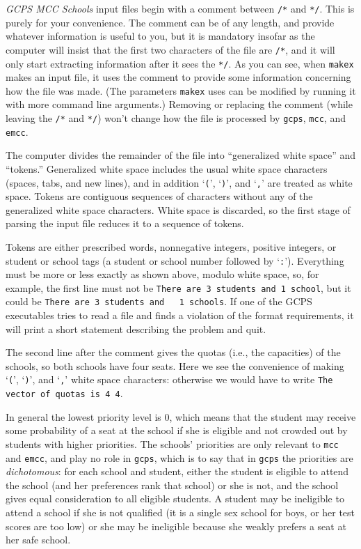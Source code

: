 \documentclass[12pt]{article}
\theoremstyle{definition}
\begin{document}
\medskip

\emph{GCPS MCC Schools} input files begin with a comment between
\texttt{/*} and \texttt{*/}.  This is purely for your convenience.
The comment can be of any length, and provide whatever information is
useful to you, but it is mandatory insofar as the computer will insist
that the first two characters of the file are \texttt{/*}, and it will
only start extracting information after it sees the \texttt{*/}.  As
you can see, when \texttt{makex} makes an input file, it uses the
comment to provide some information concerning how the file was made.
(The parameters \texttt{makex} uses can be modified by running it with
more command line arguments.)  Removing or replacing the comment
(while leaving the \texttt{/*} and \texttt{*/}) won't change how the
file is processed by \texttt{gcps}, \texttt{mcc}, and \texttt{emcc}.

The computer divides the remainder of the file into ``generalized
white space'' and ``tokens.''  Generalized white space includes the
usual white space characters (spaces, tabs, and new lines), and in
addition `\texttt{(}', `\texttt{)}', and `\texttt{,}' are treated as
white space.  Tokens are contiguous sequences of characters without
any of the generalized white space characters.  White space is
discarded, so the first stage of parsing the input file reduces it to
a sequence of tokens.

Tokens are either prescribed words, nonnegative integers, positive
integers, or student or school tags (a student or school number
followed by `\texttt{:}').  Everything must be more or less exactly as
shown above, modulo white space, so, for example, the first line must
not be \texttt{There are 3 students and 1 school}, but it could be
\texttt{There are 3 students and \ \ 1 schools}.  If one of the GCPS
executables tries to read a file and finds a violation of the format
requirements, it will print a short statement describing the problem
and quit.

The second line after the comment gives the quotas (i.e., the
capacities) of the schools, so both schools have four seats.
Here we see the convenience of making `\texttt{(}', `\texttt{)}', and
`\texttt{,}' white space characters: otherwise we would have to write
\texttt{The vector of quotas is 4 4}.

In general the lowest priority level is 0, which means that the
student may receive some probability of a seat at the school if she is
eligible and not crowded out by students with higher priorities.  The
schools' priorities are only relevant to \texttt{mcc} and
\texttt{emcc}, and play no role in \texttt{gcps}, which is to say that
in \texttt{gcps} the priorities are \emph{dichotomous}: for each
school and student, either the student is eligible to attend the
school (and her preferences rank that school) or she is not, and the
school gives equal consideration to all eligible students.  A student
may be ineligible to attend a school if she is not qualified (it is a
single sex school for boys, or her test scores are too low) or she may
be ineligible because she weakly prefers a seat at her safe school.
\end{document}
